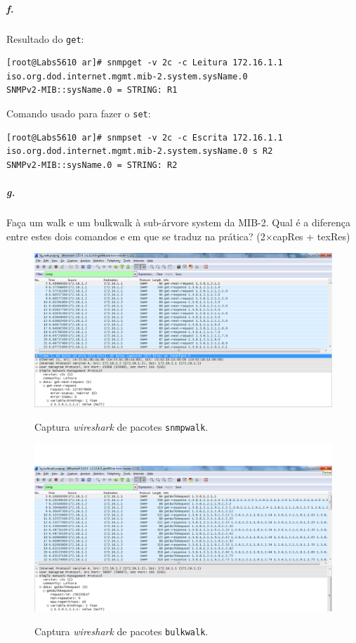 \subparagraph{f.}
Resultado do \texttt{get}:
\begin{verbatim}
[root@Labs5610 ar]# snmpget -v 2c -c Leitura 172.16.1.1 iso.org.dod.internet.mgmt.mib-2.system.sysName.0
SNMPv2-MIB::sysName.0 = STRING: R1
\end{verbatim}

Comando usado para fazer o \texttt{set}:
\begin{verbatim}
[root@Labs5610 ar]# snmpset -v 2c -c Escrita 172.16.1.1 iso.org.dod.internet.mgmt.mib-2.system.sysName.0 s R2
SNMPv2-MIB::sysName.0 = STRING: R2
\end{verbatim}


\subparagraph{g.}
Faça um walk e um bulkwalk à sub-árvore system da MIB-2. Qual é a diferença entre estes dois comandos e em que se traduz na prática? (2×capRes + texRes)

\begin{figure}[h]
\centering
\includegraphics[width=1\textwidth, height=0.33\textheight]{5g_walk.png}
\label{fig:2-capturaWireshark}
\caption{Captura \emph{wireshark} de pacotes \texttt{snmpwalk}.}
\end{figure}

\begin{figure}[h]
\centering
\includegraphics[width=1\textwidth, height=0.33\textheight]{5g_bulkwalk.png}
\label{fig:2-capturaWireshark}
\caption{Captura \emph{wireshark} de pacotes \texttt{bulkwalk}.}
\end{figure}


